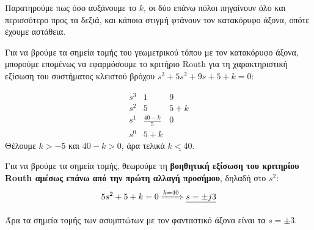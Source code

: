 \documentclass[11pt,a4paper,notitlepage,fleqn]{article}
\begin{document}
\begin{exercise}
	Παρατηρούμε πως όσο αυξάνουμε το \( k \), οι δύο επάνω πόλοι πηγαίνουν όλο και περισσότερο
	προς τα δεξιά, και κάποια στιγμή φτάνουν τον κατακόρυφο άξονα, οπότε έχουμε αστάθεια.
	
	Για να βρούμε τα σημεία τομής του γεωμετρικού τόπου με τον κατακόρυφο άξονα, μπορούμε επομένως
	να εφαρμόσουμε το κριτήριο Routh για τη χαρακτηριστική εξίσωση του συστήματος κλειστού
	βρόχου \(  s^3+5s^2+9s+5+k = 0 \):
	
	\[
	\begin{array}{r|cc}
	s^3&1&9\\
	s^2&5&5+k\\
	s^1&\frac{40-k}{5}&0\\
	s^0&5+k
	\end{array}
	\]
	Θέλουμε \( k>-5 \) και \( 40-k>0 \), άρα τελικά \( \underline{k<40} \).
	
	Για να βρούμε τα σημεία τομής, θεωρούμε τη \textbf{βοηθητική εξίσωση του κριτηρίου Routh
		αμέσως επάνω από την πρώτη αλλαγή προσήμου}, δηλαδή στο \( s^2 \):
	\[
	5s^2+5+k = 0 \xRightarrow{k=40} \underline{s= \pm j3}
	\]
	
	Άρα τα σημεία τομής των ασυμπτώτων με τον φανταστικό άξονα είναι τα \( s=\pm 3 \).

	\hspace{0pt}
\end{exercise}
\end{document}
